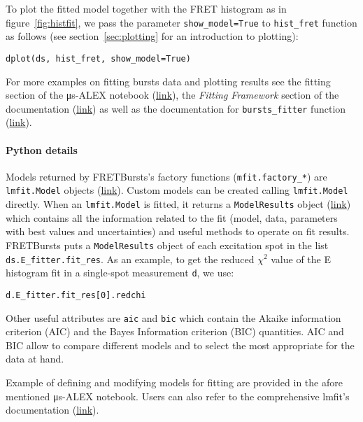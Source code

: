 To plot the fitted model together with the FRET histogram as in
figure~\ref{fig:histfit}, we pass the parameter \verb|show_model=True|
to \verb|hist_fret| function as follows
(see section~\ref{sec:plotting} for an introduction to plotting):

\begin{lstlisting}
dplot(ds, hist_fret, show_model=True)
\end{lstlisting}

For more examples on fitting bursts data and plotting results see the
fitting section of the μs-ALEX notebook (\href{http://nbviewer.jupyter.org/github/tritemio/FRETBursts_notebooks/blob/master/notebooks/FRETBursts%20-%20us-ALEX%20smFRET%20burst%20analysis.ipynb#FRET-fit:-in-depth-example}{link}),
the \textit{Fitting Framework} section of the documentation
(\href{http://fretbursts.readthedocs.org/en/latest/fit.html}{link})
as well as the documentation for \verb|bursts_fitter| function 
(\href{http://fretbursts.readthedocs.org/en/latest/plugins.html#fretbursts.burstlib_ext.bursts_fitter}{link}).

\paragraph{Python details}

Models returned by FRETBursts's factory functions (\verb|mfit.factory_*|)
are \verb|lmfit.Model| objects (\href{https://lmfit.github.io/lmfit-py/model.html}{link}).
Custom models can be created calling \verb|lmfit.Model| directly.
When an \verb|lmfit.Model| is fitted, it returns a \verb|ModelResults| object
(\href{https://lmfit.github.io/lmfit-py/model.html#the-modelresult-class}{link})
which contains all the information related to the fit (model, data,
parameters with best values and uncertainties) and useful methods to operate on fit results.
FRETBursts puts a \verb|ModelResults| object of each excitation spot in the list
\verb|ds.E_fitter.fit_res|.
As an example, to get the reduced $\chi^2$ value of the E histogram fit in a
single-spot measurement \verb|d|, we use:

\begin{lstlisting}
d.E_fitter.fit_res[0].redchi
\end{lstlisting}

Other useful attributes are \verb|aic| and \verb|bic| which contain the
Akaike information criterion (AIC) and the Bayes Information criterion (BIC)
quantities. AIC and BIC allow to compare different models and
to select the most appropriate for the data at hand.

Example of defining and modifying models for fitting are provided in
the afore mentioned μs-ALEX notebook.
Users can also refer to the comprehensive lmfit's documentation
(\href{http://lmfit.github.io/lmfit-py/}{link}).
